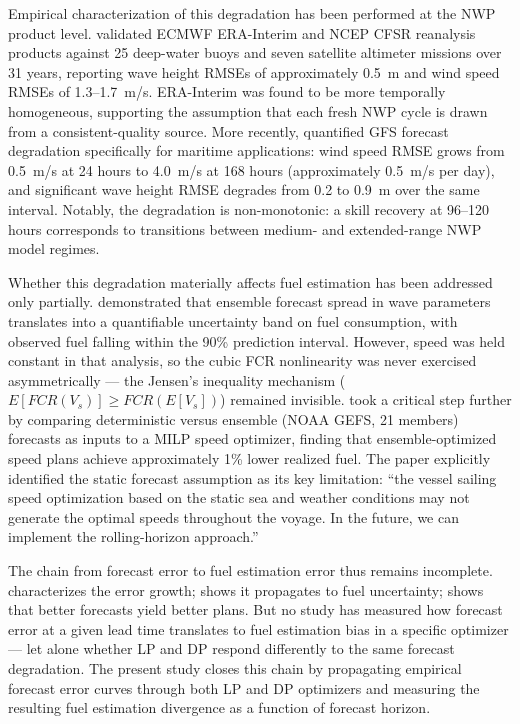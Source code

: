 \documentclass[review]{elsarticle}
\begin{document}
Empirical characterization of this degradation has been performed at the NWP product level. \cite{Stopa2014} validated ECMWF ERA-Interim and NCEP CFSR reanalysis products against 25 deep-water buoys and seven satellite altimeter missions over 31 years, reporting wave height RMSEs of approximately 0.5~m and wind speed RMSEs of 1.3--1.7~m/s. ERA-Interim was found to be more temporally homogeneous, supporting the assumption that each fresh NWP cycle is drawn from a consistent-quality source. More recently, \cite{Marjanovic2025} quantified GFS forecast degradation specifically for maritime applications: wind speed RMSE grows from 0.5~m/s at 24 hours to 4.0~m/s at 168 hours (approximately 0.5~m/s per day), and significant wave height RMSE degrades from 0.2 to 0.9~m over the same interval. Notably, the degradation is non-monotonic: a skill recovery at 96--120 hours corresponds to transitions between medium- and extended-range NWP model regimes.

Whether this degradation materially affects fuel estimation has been addressed only partially. \cite{Vettor2022} demonstrated that ensemble forecast spread in wave parameters translates into a quantifiable uncertainty band on fuel consumption, with observed fuel falling within the 90\% prediction interval. However, speed was held constant in that analysis, so the cubic FCR nonlinearity was never exercised asymmetrically --- the Jensen's inequality mechanism ($E[FCR(V_s)] \geq FCR(E[V_s])$) remained invisible. \cite{Luo2023} took a critical step further by comparing deterministic versus ensemble (NOAA GEFS, 21 members) forecasts as inputs to a MILP speed optimizer, finding that ensemble-optimized speed plans achieve approximately 1\% lower realized fuel. The paper explicitly identified the static forecast assumption as its key limitation: ``the vessel sailing speed optimization based on the static sea and weather conditions may not generate the optimal speeds throughout the voyage. In the future, we can implement the rolling-horizon approach.''

The chain from forecast error to fuel estimation error thus remains incomplete. \cite{Marjanovic2025} characterizes the error growth; \cite{Vettor2022} shows it propagates to fuel uncertainty; \cite{Luo2023} shows that better forecasts yield better plans. But no study has measured how forecast error at a given lead time translates to fuel estimation bias in a specific optimizer --- let alone whether LP and DP respond differently to the same forecast degradation. The present study closes this chain by propagating empirical forecast error curves through both LP and DP optimizers and measuring the resulting fuel estimation divergence as a function of forecast horizon.
\end{document}
